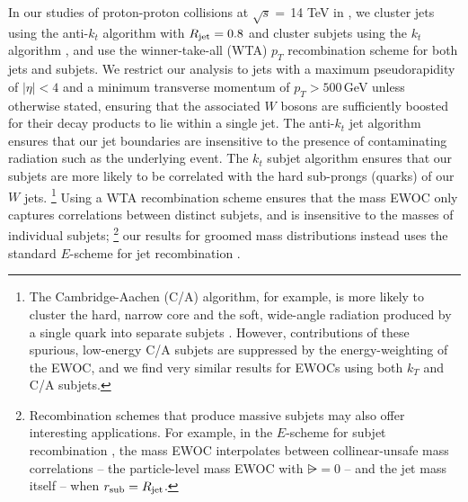 \begin{subappendices}
In our studies of proton-proton collisions at \(\sqrt{s}=\,\)14 TeV in , we cluster jets using the anti-\(k_t\) algorithm \cite{Cacciari:2008gp} with \(R_\text{jet} = 0.8\) and cluster subjets using the \(k_t\) algorithm \cite{Catani:1993hr,Ellis:1993tq}, and use the winner-take-all (WTA) \(p_T\) recombination scheme \cite{Bertolini:2013iqa,Larkoski:2014uqa} for both jets and subjets.
%
We restrict our analysis to jets with a maximum pseudorapidity of \(|\eta| < 4\) and a minimum transverse momentum of \(p_T > 500\,\)GeV unless otherwise stated, ensuring that the associated \(W\) bosons are sufficiently boosted for their decay products to lie within a single jet.
%
The anti-\(k_t\) jet algorithm ensures that our jet boundaries are insensitive to the presence of contaminating radiation such as the underlying event.
%
The \(k_t\) subjet algorithm ensures that our subjets are more likely to be correlated with the hard sub-prongs (quarks) of our \(W\) jets.%
\footnote{
    The Cambridge-Aachen (C/A) \cite{Dokshitzer:1997in,Wobisch:1998wt} algorithm, for example, is more likely to cluster the hard, narrow core and the soft, wide-angle radiation produced by a single quark into separate subjets \cite{Atkin:2015msa,istep:2016,boost:2024}.
    However, contributions of these spurious, low-energy C/A subjets are suppressed by the energy-weighting of the EWOC, and we find very similar results for EWOCs using both \(k_T\) and C/A subjets.
}
%
Using a WTA recombination scheme ensures that the mass EWOC only captures correlations between distinct subjets, and is insensitive to the masses of individual subjets;%
\footnote{
    Recombination schemes that produce massive subjets may also offer interesting applications.
    For example, in the \(E\)-scheme for subjet recombination \cite{Blazey:2000qt}, the mass EWOC interpolates between collinear-unsafe mass correlations -- the particle-level mass EWOC with \(\rsub=0\) -- and the jet mass itself -- when \(r_\text{sub}=R_\text{jet}\).
}
our results for groomed mass distributions instead uses the standard \(E\)-scheme for jet recombination \cite{Blazey:2000qt}.


\end{subappendices}
